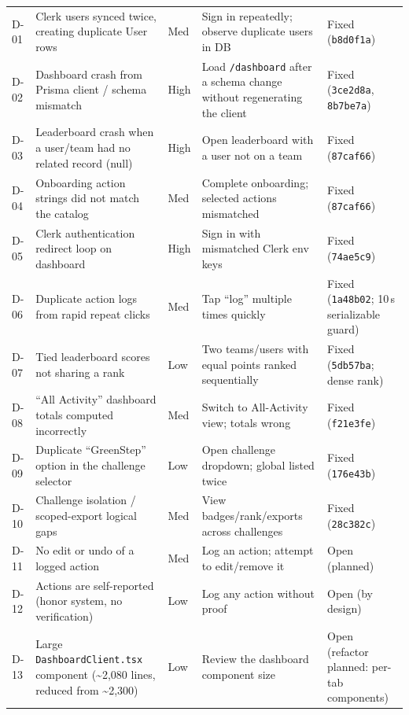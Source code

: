 \documentclass[11pt]{article}
\begin{document}
{\begin{longtable}{p{0.8cm} p{4.0cm} p{1.5cm} p{4.6cm} p{2.6cm}}
D-01 & Clerk users synced twice, creating duplicate User rows & Med &
Sign in repeatedly; observe duplicate users in DB & Fixed (\texttt{b8d0f1a}) \\
\addlinespace
D-02 & Dashboard crash from Prisma client / schema mismatch & High &
Load \texttt{/dashboard} after a schema change without regenerating the client
& Fixed (\texttt{3ce2d8a}, \texttt{8b7be7a}) \\
\addlinespace
D-03 & Leaderboard crash when a user/team had no related record (null) & High &
Open leaderboard with a user not on a team & Fixed (\texttt{87caf66}) \\
\addlinespace
D-04 & Onboarding action strings did not match the catalog & Med &
Complete onboarding; selected actions mismatched & Fixed (\texttt{87caf66}) \\
\addlinespace
D-05 & Clerk authentication redirect loop on dashboard & High &
Sign in with mismatched Clerk env keys & Fixed (\texttt{74ae5c9}) \\
\addlinespace
D-06 & Duplicate action logs from rapid repeat clicks & Med &
Tap ``log'' multiple times quickly & Fixed (\texttt{1a48b02}; 10\,s
serializable guard) \\
\addlinespace
D-07 & Tied leaderboard scores not sharing a rank & Low &
Two teams/users with equal points ranked sequentially & Fixed
(\texttt{5db57ba}; dense rank) \\
\addlinespace
D-08 & ``All Activity'' dashboard totals computed incorrectly & Med &
Switch to All-Activity view; totals wrong & Fixed (\texttt{f21e3fe}) \\
\addlinespace
D-09 & Duplicate ``GreenStep'' option in the challenge selector & Low &
Open challenge dropdown; global listed twice & Fixed (\texttt{176e43b}) \\
\addlinespace
D-10 & Challenge isolation / scoped-export logical gaps & Med &
View badges/rank/exports across challenges & Fixed (\texttt{28c382c}) \\
\addlinespace
D-11 & No edit or undo of a logged action & Med &
Log an action; attempt to edit/remove it & Open (planned) \\
\addlinespace
D-12 & Actions are self-reported (honor system, no verification) & Low &
Log any action without proof & Open (by design) \\
\addlinespace
D-13 & Large \texttt{DashboardClient.tsx} component (\textasciitilde 2{,}080
lines, reduced from \textasciitilde 2{,}300) & Low &
Review the dashboard component size & Open (refactor planned: per-tab
components) \\

\end{longtable}
}
\end{document}
